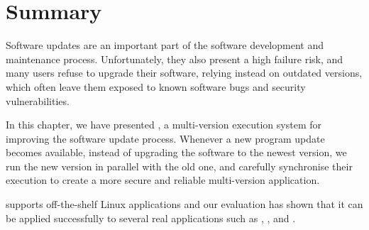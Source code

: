 \section{Summary}
\label{safe-updates:summary}

Software updates are an important part of the software development and
maintenance process. Unfortunately, they also present a high failure risk, and
many users refuse to upgrade their software, relying instead on outdated
versions, which often leave them exposed to known software bugs and security
vulnerabilities.

In this chapter, we have presented \mx, a multi-version execution system for
improving the software update process. Whenever a new program update becomes
available, instead of upgrading the software to the newest version, we run the
new version in parallel with the old one, and carefully synchronise their
execution to create a more secure and reliable multi-version application.

\mx supports off-the-shelf Linux applications and our evaluation has shown that
it can be applied successfully to several real applications such as \coreutils,
\lighttpd, and \redis.
